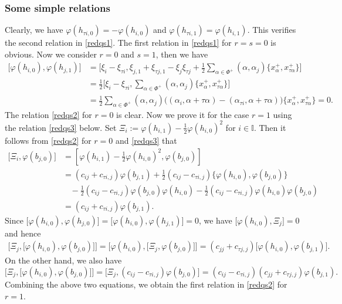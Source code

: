 \documentclass[11pt,reqno]{amsart}
\numberwithin{equation}{section}
\theoremstyle{definition}
\theoremstyle{remark}
\newcommand{\hf}{\tfrac12}
\newcommand{\I}{{\mathbb I}}
\begin{document}
\subsubsection{Some simple relations}\label{ssec:simple-relations}
Clearly, we have $\varphi(h_{\tau i,0})=-\varphi(h_{i,0})$ and $\varphi(h_{\tau i,1})=\varphi(h_{i,1})$. This verifies the second relation in \eqref{redqs1}. The first relation in \eqref{redqs1} for $r=s=0$ is obvious. Now we consider $r=0$ and $s=1$, then we have
\begin{align*}
\big[\varphi(h_{i,0}),\varphi(h_{j,1})\big]&=\Big[\xi_i-\xi_{\tau i},\xi_{j,1}+\xi_{\tau j,1}-\xi_{j}\xi_{\tau j}+\hf\sum_{\alpha\in \Phi^+}(\alpha,\alpha_j)\big\{x_\alpha^+,x_{\tau \alpha}^+\big\}\Big]\\
&=\hf\Big[\xi_i-\xi_{\tau i},\sum_{\alpha\in\Phi^+}(\alpha,\alpha_j)\big\{x_\alpha^+,x_{\tau \alpha}^+\big\}\Big]\\
&=\hf\sum_{\alpha\in\Phi^+}(\alpha,\alpha_j)\big((\alpha_i,\alpha+\tau\alpha)-(\alpha_{\tau i},\alpha+\tau \alpha)\big)\big\{x_\alpha^+,x_{\tau \alpha}^+\big\}=0.
\end{align*}
The relation \eqref{redqs2} for $r=0$ is clear. Now we prove it for the case $r=1$ using the relation \eqref{redqs3} below. Set $\Xi_i:=\varphi(h_{i,1})-\hf\varphi(h_{i,0})^2$ for $i\in \I$. Then it follows from \eqref{redqs2} for $r=0$ and \eqref{redqs3} that
\begin{align*}
\big[\Xi_i,\varphi(b_{j,0})\big]&=[\varphi(h_{i,1})-\hf\varphi(h_{i,0})^2,\varphi(b_{j,0})]\\
&=(c_{ij}+c_{\tau i,j})\varphi(b_{j,1})+\hf(c_{ij}-c_{\tau i,j})\big\{\varphi(h_{i,0}),\varphi(b_{j,0})\big\}\\
&~~~~-\hf(c_{ij}-c_{\tau i,j})\varphi(b_{j,0})\varphi(h_{i,0})-\hf(c_{ij}-c_{\tau i,j})\varphi(h_{i,0})\varphi(b_{j,0})\\
&=(c_{ij}+c_{\tau i,j})\varphi(b_{j,1}).
\end{align*}
Since $\big[\varphi(h_{i,0}),\varphi(h_{j,0})\big]=\big[\varphi(h_{i,0}),\varphi(h_{j,1})\big]=0$, we have $\big[\varphi(h_{i,0}),\Xi_j\big]=0$ and hence
\begin{align*}
\big[\Xi_j,\big[\varphi(h_{i,0}),\varphi(b_{j,0})\big]\big]=\big[\varphi(h_{i,0}),\big[\Xi_j,\varphi(b_{j,0})\big]\big]=(c_{jj}+c_{\tau j,j})\big[\varphi(h_{i,0}),\varphi(b_{j,1})\big].
\end{align*}
On the other hand, we also have
\[
\big[\Xi_j,\big[\varphi(h_{i,0}),\varphi(b_{j,0})\big]\big]=\big[\Xi_j,(c_{ij}-c_{\tau i,j})\varphi(b_{j,0})\big]=(c_{ij}-c_{\tau i,j})(c_{jj}+c_{\tau j,j})\varphi(b_{j,1}).
\]
Combining the above two equations, we obtain the first relation in \eqref{redqs2} for $r=1$.
\end{document}
